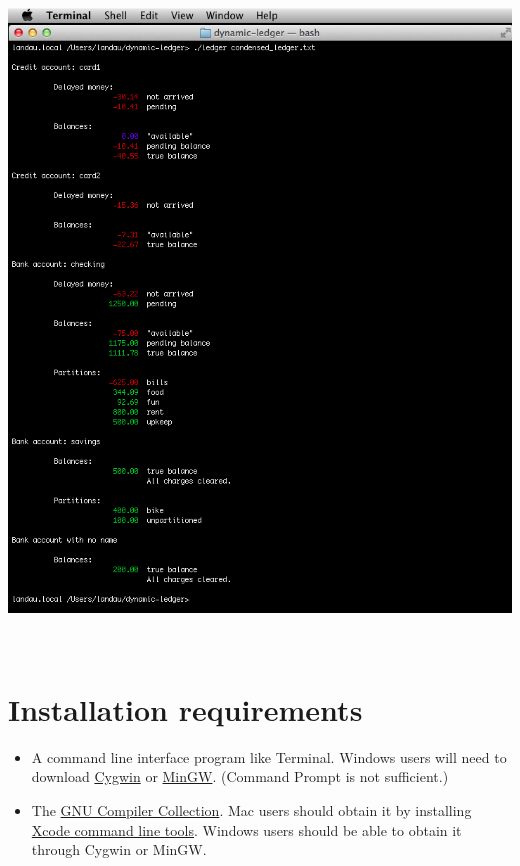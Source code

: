 \documentclass{article}
\providecommand{\q}{$\quad$ \newline}
\begin{document}
\begin{flushleft}
\begin{center}
\includegraphics[scale=.5]{fig/sum2.png}
\end{center} \q



\section{Installation requirements}

\begin{itemize}
\item A command line interface program like Terminal. Windows users will need to download \href{http://www.cygwin.org}{Cygwin} or \href{http://www.mingw.org/}{MinGW}. (Command Prompt is not sufficient.)
\item The \href{http://gcc.gnu.org/}{GNU Compiler Collection}. Mac users should obtain it by installing \href{http://railsapps.github.io/xcode-command-line-tools.html}{Xcode command line tools}. Windows users should be able to obtain it through Cygwin or MinGW.
\end{itemize}



\end{flushleft}
\end{document}

